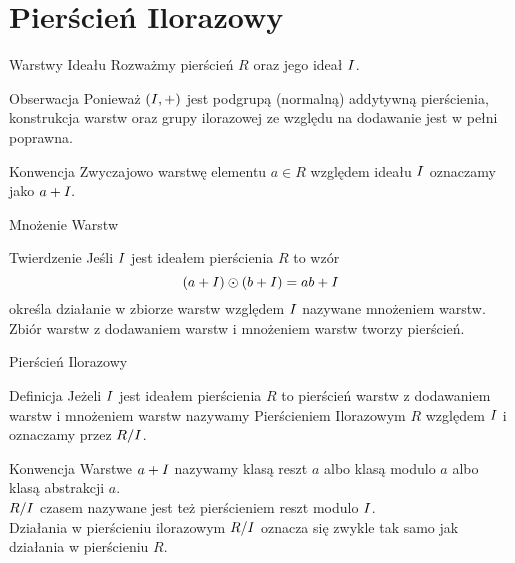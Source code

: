 \documentclass{beamer}
\newcommand{\II}{\mathnormal{I}}
\begin{document}
\section{Pierścień Ilorazowy}
\begin{frame}{Warstwy Ideału}
    Rozważmy pierścień $R$ oraz jego ideał $\II$.
    \begin{alertblock}{Obserwacja}
        Ponieważ $(\II, +)$ jest podgrupą (normalną) addytywną pierścienia, konstrukcja warstw oraz grupy ilorazowej ze względu na dodawanie jest w pełni poprawna.
    \end{alertblock}
    \begin{alertblock}{Konwencja}
        Zwyczajowo warstwę elementu $a \in R$ względem ideału $\II$ oznaczamy jako $a + \II.$ 
    \end{alertblock}
\end{frame}

\begin{frame}{Mnożenie Warstw}
    \begin{block}{Twierdzenie}
        Jeśli $\II$ jest ideałem pierścienia $R$ to wzór
        $$(a + \II) \odot (b + \II) = ab + \II$$
        określa działanie w zbiorze warstw względem $\II$ nazywane mnożeniem warstw. Zbiór warstw z dodawaniem warstw i mnożeniem warstw tworzy pierścień.
    \end{block}
\end{frame}

\begin{frame}{Pierścień Ilorazowy}
    \begin{block}{Definicja}
        Jeżeli $\II$ jest ideałem pierścienia $R$ to pierścień warstw z dodawaniem warstw i mnożeniem warstw nazywamy \alert{Pierścieniem Ilorazowym} $R$ względem $\II$ i oznaczamy przez $R/\II$.
    \end{block}
    \pause 
    \begin{alertblock}{Konwencja}
        Warstwe $a + \II$ nazywamy klasą reszt $a$ albo klasą modulo $a$ albo klasą abstrakcji $a$. \\
        $R/\II$ czasem nazywane jest też pierścieniem reszt modulo $\II$. \\
        Działania w pierścieniu ilorazowym $R/\II$ oznacza się zwykle tak samo jak działania w pierścieniu $R$.
    \end{alertblock}
\end{frame}
\end{document}
